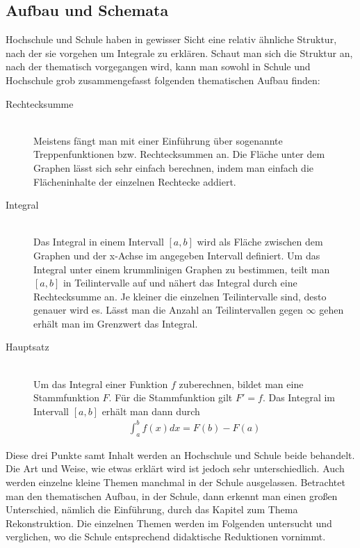 \documentclass[a4paper]{article}
\begin{document}
\subsection{Aufbau und Schemata}
Hochschule und Schule haben in gewisser Sicht eine relativ ähnliche Struktur, nach der sie vorgehen um Integrale zu erklären. Schaut man sich die Struktur an, nach der thematisch vorgegangen wird, kann man sowohl in Schule und Hochschule grob zusammengefasst folgenden thematischen Aufbau finden:
\begin{description}
\item [Rechtecksumme] \hfill \\
Meistens fängt man mit einer Einführung über sogenannte Treppenfunktionen bzw. Rechtecksummen an. Die Fläche unter dem Graphen lässt sich sehr einfach berechnen, indem man einfach die Flächeninhalte der einzelnen Rechtecke addiert. 
\item [Integral] \hfill \\
Das Integral in einem Intervall $[a,b]$ wird als Fläche zwischen dem Graphen und der x-Achse im angegeben Intervall definiert. Um das Integral unter einem krummlinigen Graphen zu bestimmen, teilt man $[a,b]$ in Teilintervalle auf und nähert das Integral durch eine Rechtecksumme an. Je kleiner die einzelnen Teilintervalle sind, desto genauer wird es. Lässt man die Anzahl an Teilintervallen gegen $\infty$ gehen erhält man im Grenzwert das Integral. 
\item [Hauptsatz] \hfill \\
Um das Integral einer Funktion $f$ zuberechnen, bildet man eine Stammfunktion $F$. Für die Stammfunktion gilt $F' = f$. Das Integral im Intervall $[a,b]$ erhält man dann durch
\begin{align*}
\int_a^b f(x) dx = F(b) - F(a)
\end{align*}
\end{description}
Diese drei Punkte samt Inhalt werden an Hochschule und Schule beide behandelt. Die Art und Weise, wie etwas erklärt wird ist jedoch sehr unterschiedlich. Auch werden einzelne kleine Themen manchmal in der Schule ausgelassen. Betrachtet man den thematischen Aufbau, in der Schule, dann erkennt man einen großen Unterschied, nämlich die Einführung, durch das Kapitel zum Thema Rekonstruktion. Die einzelnen Themen werden im Folgenden untersucht und verglichen, wo die Schule entsprechend didaktische Reduktionen vornimmt. 
\end{document}
